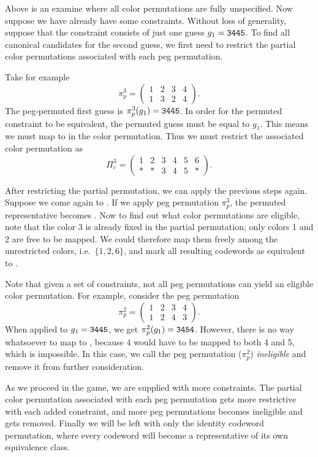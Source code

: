 Above is an examine where all color permutations are fully unspecified. Now suppose we have already have some constraints. Without loss of generality, suppose that the constraint consists of just one guess $g_1 = \texttt{3445}$. To find all canonical candidates for the second guess, we first need to restrict the partial color permutations associated with each peg permutation. 

Take for example 
\[
\pi_p^3 = 
\begin{pmatrix}
1 & 2 & 3 & 4 \\
1 & 3 & 2 & 4
\end{pmatrix} .
\] 
The peg-permuted first guess is $\pi_p^3(g_1) = \texttt{3445}$. In order for the permuted constraint to be equivalent, the permuted guess must be equal to $g_1$. This means we must map  to  in the color permutation. Thus we must restrict the associated color permutation as
\[
\Pi_c^3 = 
\begin{pmatrix}
1 & 2 & 3 & 4 & 5 & 6 \\
* & * & 3 & 4 & 5 & * 
\end{pmatrix} .
\]

After restricting the partial permutation, we can apply the previous steps again. Suppose we come again to . If we apply peg permutation $\pi_p^3$, the permuted representative becomes . Now to find out what color permutations are eligible, note that the color 3 is already fixed in the partial permutation; only colors 1 and 2 are free to be mapped. We could therefore map them freely among the unrestricted colors, i.e.\ $\{1, 2, 6\}$, and mark all resulting codewords as equivalent to .

Note that given a set of constraints, not all peg permutations can yield an eligible color permutation. For example, consider the peg permutation
\[
\pi_p^2 = 
\begin{pmatrix}
1 & 2 & 3 & 4 \\
1 & 2 & 4 & 3
\end{pmatrix} .
\]
When applied to $g_1 = \texttt{3445}$, we get $\pi_p^2(g_1) = \texttt{3454}$. However, there is no way whatsoever to map  to , because 4 would have to be mapped to both 4 and 5, which is impossible. In this case, we call the peg permutation ($\pi_p^2$) \emph{ineligible} and remove it from further consideration.

As we proceed in the game, we are supplied with more constraints. The partial color permutation associated with each peg permutation gets more restrictive with each
added constraint, and more peg permutations becomes ineligible and gets removed. Finally we will be left with only the identity codeword permutation, where every codeword will become a representative of its own equivalence class.

